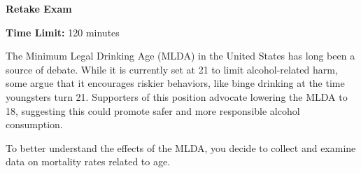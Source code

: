\documentclass[11pt]{exam}
\newcommand{\exam}{Retake Exam}
\begin{document}
\begin{center}

    {\Huge \textbf{\exam{}}}
    \vspace{0.7cm}

    \begin{flushright}
        \textbf{Time Limit:} 120 minutes
    \end{flushright}
    \vspace{-0.2cm}

    
\end{center}

    The Minimum Legal Drinking Age (MLDA) in the United States has long been a source of debate. While it is currently set at 21 to limit alcohol-related harm, some argue that it encourages riskier behaviors, like binge drinking at the time youngsters turn 21. Supporters of this position advocate lowering the MLDA to 18, suggesting this could promote safer and more responsible alcohol consumption. 
    
    To better understand the effects of the MLDA, you decide to collect and examine data on mortality rates related to age.

\end{document}
